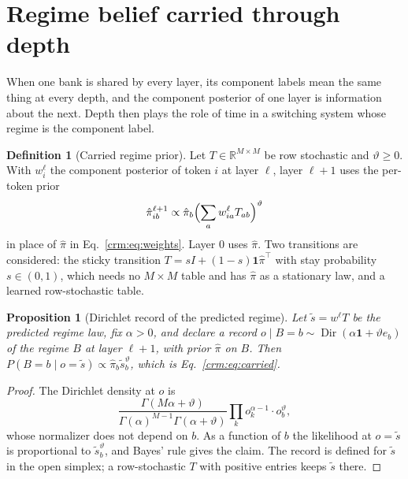 \documentclass[11pt]{article}
\newtheorem{proposition}[theorem]{Proposition}
\theoremstyle{definition}
\newtheorem{definition}[theorem]{Definition}
\theoremstyle{remark}
\newcommand{\R}{\mathbb R}
\newcommand{\Dir}{\operatorname{Dir}}
\newcommand{\pihat}{\hat\pi}
\begin{document}
\section{Regime belief carried through depth}
\label{crm:sec:depth}

When one bank is shared by every layer, its component labels mean the same thing at every depth, and the component posterior of one layer is information about the next. Depth then plays the role of time in a switching system whose regime is the component label.

\begin{definition}[Carried regime prior]
\label{crm:def:carried}
Let $T\in\R^{M\times M}$ be row stochastic and $\vartheta\ge0$. With $w^\ell_i$ the component posterior of token $i$ at layer $\ell$, layer $\ell+1$ uses the per-token prior
\begin{equation}
\pihat^{\ell+1}_{ib}\propto\pihat_b\Bigl(\sum_aw^\ell_{ia}T_{ab}\Bigr)^\vartheta
\label{crm:eq:carried}
\end{equation}
in place of $\pihat$ in Eq.~\eqref{crm:eq:weights}. Layer $0$ uses $\pihat$. Two transitions are considered: the sticky transition $T=sI+(1-s)\mathbf 1\pihat^\top$ with stay probability $s\in(0,1)$, which needs no $M\times M$ table and has $\pihat$ as a stationary law, and a learned row-stochastic table.
\end{definition}

\begin{proposition}[Dirichlet record of the predicted regime]
\label{crm:prop:dirichlet}
Let $\tilde s=w^\ell T$ be the predicted regime law, fix $\alpha>0$, and declare a record $o\mid B=b\sim\Dir(\alpha\mathbf 1+\vartheta e_b)$ of the regime $B$ at layer $\ell+1$, with prior $\pihat$ on $B$. Then $P(B=b\mid o=\tilde s)\propto\pihat_b\tilde s_b^\vartheta$, which is Eq.~\eqref{crm:eq:carried}.
\end{proposition}

\begin{proof}
The Dirichlet density at $o$ is
\[
\frac{\Gamma(M\alpha+\vartheta)}{\Gamma(\alpha)^{M-1}\Gamma(\alpha+\vartheta)}\prod_ko_k^{\alpha-1}\cdot o_b^\vartheta,
\]
whose normalizer does not depend on $b$. As a function of $b$ the likelihood at $o=\tilde s$ is proportional to $\tilde s_b^\vartheta$, and Bayes' rule gives the claim. The record is defined for $\tilde s$ in the open simplex; a row-stochastic $T$ with positive entries keeps $\tilde s$ there.
\end{proof}
\end{document}
